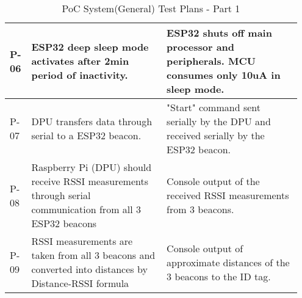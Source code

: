 \begin{table}[h!]
\begin{tabular}{|m{0.05\linewidth}|m{0.45\linewidth}|m{0.45\linewidth}|}
    P-06
    & ESP32 deep sleep mode activates after 2min period of inactivity. 
    & ESP32 shuts off main processor and peripherals. MCU consumes only 10uA in sleep mode.\\ 
    \hline

    P-07
    & DPU transfers data through serial to a ESP32 beacon.
    & "Start" command sent serially by the DPU and received serially by the ESP32 beacon.\\ 
    \hline

    P-08
    & Raspberry Pi (DPU) should receive RSSI measurements through serial communication from all 3 ESP32 beacons
    & Console output of the received RSSI measurements from 3 beacons. \\ 
    \hline

    P-09
    & RSSI measurements are taken from all 3 beacons and converted into distances by Distance-RSSI formula
    & Console output of approximate distances of the 3 beacons to the ID tag. \\ 
    \hline
    \end{tabular}
    \caption{PoC System(General) Test Plans - Part 1}
\end{table}
\pagebreak
